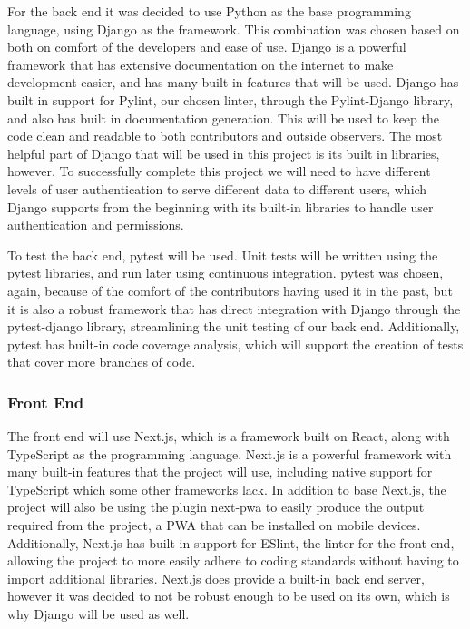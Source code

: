 \documentclass{article}
\begin{document}
For the back end it was decided to use Python as the base programming language, using Django as the framework. This combination was chosen based on both on comfort of the developers and ease of use. Django is a powerful framework that has extensive documentation on the internet to make development easier, and has many built in features that will be used. Django has built in support for Pylint, our chosen linter, through the Pylint-Django library, and also has built in documentation generation. This will be used to keep the code clean and readable to both contributors and outside observers. The most helpful part of Django that will be used in this project is its built in libraries, however. To successfully complete this project we will need to have different levels of user authentication to serve different data to different users, which Django supports from the beginning with its built-in libraries to handle user authentication and permissions.

To test the back end, pytest will be used. Unit tests will be written using the pytest libraries, and run later using continuous integration. pytest was chosen, again, because of the comfort of the contributors having used it in the past, but it is also a robust framework that has direct integration with Django through the pytest-django library, streamlining the unit testing of our back end. Additionally, pytest has built-in code coverage analysis, which will support the creation of tests that cover more branches of code.

\subsubsection{Front End}

The front end will use Next.js, which is a framework built on React, along with TypeScript as the programming language. Next.js is a powerful framework with many built-in features that the project will use, including native support for TypeScript which some other frameworks lack. In addition to base Next.js, the project will also be using the plugin next-pwa to easily produce the output required from the project, a PWA that can be installed on mobile devices. Additionally, Next.js has built-in support for ESlint, the linter for the front end, allowing the project to more easily adhere to coding standards without having to import additional libraries. Next.js does provide a built-in back end server, however it was decided to not be robust enough to be used on its own, which is why Django will be used as well.
\end{document}
